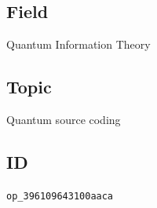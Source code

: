 \subsection*{Field}

Quantum Information Theory

\subsection*{Topic}

Quantum source coding

\subsection*{ID}

\texttt{op\_396109643100aaca}
